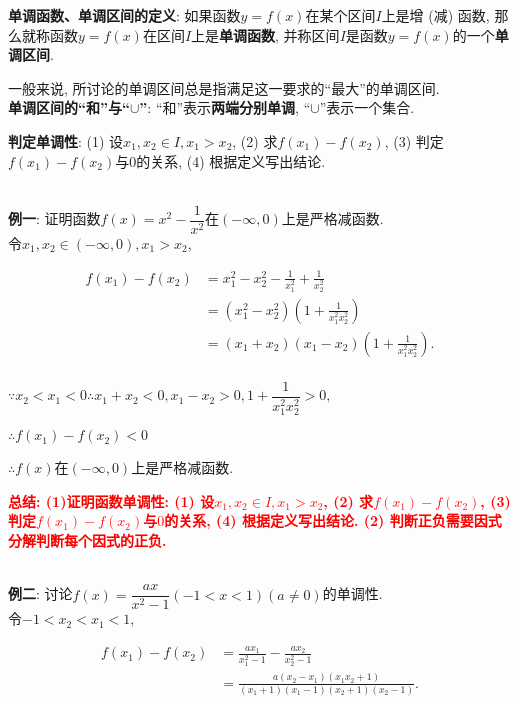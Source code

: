 \documentclass[8pt]{article}
\begin{document}
				\textbf{单调函数、单调区间的定义}: 如果函数$y=f(x)$在某个区间$I$上是增 (减) 函数, 那么就称函数$y=f(x)$在区间$I$上是\textbf{单调函数}, 并称区间$I$是函数$y=f(x)$的一个\textbf{单调区间}.

				一般来说, 所讨论的单调区间总是指满足这一要求的“最大”的单调区间.\\

				\textbf{单调区间的“和”与“$\cup$”}: “和”表示\textbf{两端分别单调}, “$\cup$”表示一个集合.

				\textbf{判定单调性}: (1) 设$x_1, x_2 \in I, x_1 > x_2$, (2) 求$f(x_1)-f(x_2)$, (3) 判定$f(x_1)-f(x_2)$与$0$的关系, (4) 根据定义写出结论.

				~\\

				\textbf{例一}: 证明函数$f(x)=x^2-\dfrac{1}{x^2}$在$(-\infty, 0)$上是严格减函数.
					~\\

					令$x_1, x_2 \in (-\infty, 0), x_1 > x_2$,

					\begin{align*}
						f(x_1)-f(x_2) &= x_1^2 - x_2^2 - \frac{1}{x_1^2} + \frac{1}{x_2^2}\\
						&= (x_1^2 - x_2^2) \left(1+\frac{1}{x_1^2 x_2^2}\right)\\
						&= (x_1 + x_2) (x_1 - x_2) \left(1+\frac{1}{x_1^2 x_2^2}\right).\\
					\end{align*}

					$\because x_2 < x_1 < 0 \therefore x_1 + x_2 < 0, x_1 - x_2 > 0, 1+\dfrac{1}{x_1^2 x_2^2} > 0,$

					$\therefore f(x_1) - f(x_2) < 0$

					$\therefore f(x)$在$(-\infty, 0)$上是严格减函数.

					\textbf{\textcolor{red}{总结: (1)证明函数单调性: (1) 设$x_1, x_2 \in I, x_1 > x_2$, (2) 求$f(x_1)-f(x_2)$, (3) 判定$f(x_1)-f(x_2)$与$0$的关系, (4) 根据定义写出结论. (2) 判断正负需要因式分解判断每个因式的正负.}}

				~\\

				\textbf{例二}: 讨论$f(x)=\dfrac{ax}{x^2-1} (-1<x<1) (a\neq 0)$的单调性.
					~\\

					令$-1<x_2<x_1<1$,

					\begin{align*}
						f(x_1) - f(x_2) &= \frac{ax_1}{x_1^2-1} - \frac{ax_2}{x_2^2-1}\\
						&= \frac{a(x_2-x_1) (x_1 x_2 + 1)}{(x_1 + 1)(x_1 - 1)(x_2 + 1)(x_2 - 1)}.
					\end{align*}
\end{document}
